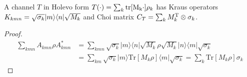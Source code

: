 \begin{lemma}
    A channel $T$ in Holevo form $T(\cdot) = \sum_k \mathrm{tr[M_k \cdot ]}\rho_k$ has Kraus operators $K_{kmn}=\sqrt{\sigma_k}\lvert m\rangle \langle n\rvert\sqrt{M_k}$ and Choi matrix $C_T = \sum_k M_k^\text T\otimes \sigma_k$. 
\end{lemma}
\begin{proof}
    \begin{align*}
\sum_{kmn} A_{kmn} \rho A_{kmn}^* &= \sum_{kmn} \sqrt{\sigma_k} |m\rangle\langle n| \sqrt{M_k} \rho \sqrt{M_k} |n\rangle\langle m| \sqrt{\sigma_k} \\
&= \sum_{km} \sqrt{\sigma_k} |m\rangle \text{Tr}[M_k \rho] \langle m| \sqrt{\sigma_k} = \sum_k \text{Tr}[M_k \rho] \sigma_k
\end{align*}
\end{proof}

